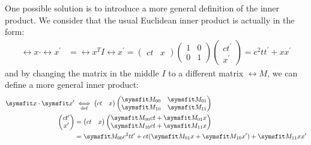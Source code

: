 One possible solution is to introduce a more general definition of the inner product.
We consider that the usual Euclidean inner product is actually in the form:
\begin{align}
  \rel{x} \cdot \rel{x}^\prime & = \rel{x}^T I \rel{x}^\prime = \begin{pmatrix}
                                                                  ct & x
                                                                \end{pmatrix}
  \begin{pmatrix}
    1 & 0 \\
    0 & 1
  \end{pmatrix}
  \begin{pmatrix}
    ct^\prime \\
    x^\prime
  \end{pmatrix} = c^2 t t^\prime + x x^\prime
\end{align}
and by changing the matrix in the middle $I$ to a different matrix $\rel{M}$, we can define a more general inner product:
\begin{align}
  \rel{x} \cdot \rel{x}^\prime
                  & \iffdef \begin{pmatrix}
                              ct & x
                            \end{pmatrix} \begin{pmatrix}
                                            \rel{M}_{00} & \rel{M}_{01} \\
                                            \rel{M}_{10} & \rel{M}_{11}
                                          \end{pmatrix}                                                    \\
  \begin{pmatrix}
    ct^\prime \\
    x^\prime
  \end{pmatrix} & = \begin{pmatrix}
                      ct & x
                    \end{pmatrix} \begin{pmatrix}
                                    \rel{M}_{00} ct + \rel{M}_{01} x \\
                                    \rel{M}_{10} ct + \rel{M}_{11} x
                                  \end{pmatrix}                                                       \\
                  & = \rel{M}_{00} c^2 t t^\prime+ ct (\rel{M}_{01} x + \rel{M}_{10} x^\prime) + \rel{M}_{11} x x^\prime
\end{align}
